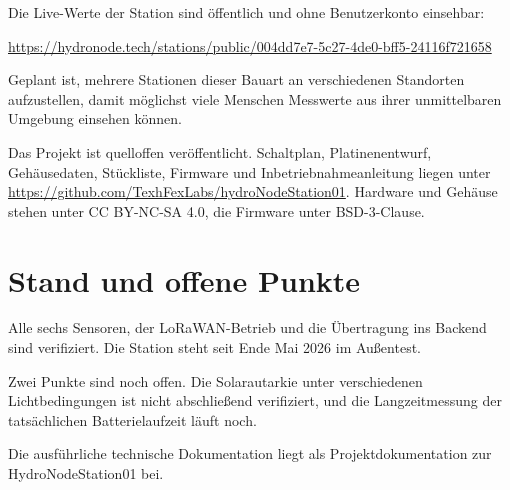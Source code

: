 \documentclass[11pt,a4paper]{scrartcl}
\begin{document}
Die Live\hspace{0pt}-Werte der Station sind öffentlich und ohne Benutzerkonto einsehbar:

\begin{center}
\url{https://hydronode.tech/stations/public/004dd7e7-5c27-4de0-bff5-24116f721658}
\end{center}

Geplant ist, mehrere Stationen dieser Bauart an verschiedenen Standorten aufzustellen, damit möglichst viele Menschen Messwerte aus ihrer unmittelbaren Umgebung einsehen können.

Das Projekt ist quelloffen veröffentlicht. Schaltplan, Platinenentwurf, Gehäusedaten, Stückliste, Firmware und Inbetriebnahmeanleitung liegen unter \url{https://github.com/TexhFexLabs/hydroNodeStation01}. Hardware und Gehäuse stehen unter CC BY\hspace{0pt}-NC\hspace{0pt}-SA 4.0, die Firmware unter BSD\hspace{0pt}-3\hspace{0pt}-Clause.

\section*{Stand und offene Punkte}

Alle sechs Sensoren, der LoRaWAN\hspace{0pt}-Betrieb und die Übertragung ins Backend sind verifiziert. Die Station steht seit Ende Mai 2026 im Außentest.

Zwei Punkte sind noch offen. Die Solarautarkie unter verschiedenen Lichtbedingungen ist nicht abschließend verifiziert, und die Langzeitmessung der tatsächlichen Batterielaufzeit läuft noch.

Die ausführliche technische Dokumentation liegt als Projektdokumentation zur HydroNodeStation01 bei.
\end{document}
